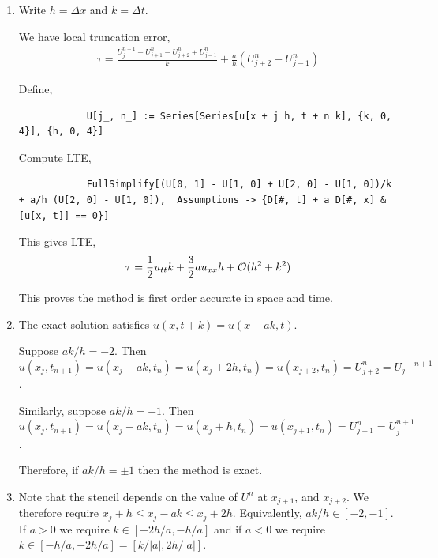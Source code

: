 \documentclass[10pt]{article}
\begin{document}
\begin{solution}[Solution]
\begin{enumerate}[label=(\alph*)]
    \item Write \( h = \Delta x \) and \( k = \Delta t \).

        We have local truncation error,
        \begin{align*}
            \tau = \frac{U_j^{n+1} - U_{j+1}^n- U_{j+2}^n + U_{j-1}^n}{k} + \frac{a}{h} \left( U_{j+2}^n - U_{j-1}^n \right)
        \end{align*}
        
        Define,
        \begin{lstlisting}
            U[j_, n_] := Series[Series[u[x + j h, t + n k], {k, 0, 4}], {h, 0, 4}]
        \end{lstlisting}

        Compute LTE,
        \begin{lstlisting}
            FullSimplify[(U[0, 1] - U[1, 0] + U[2, 0] - U[1, 0])/k + a/h (U[2, 0] - U[1, 0]),  Assumptions -> {D[#, t] + a D[#, x] &[u[x, t]] == 0}]
        \end{lstlisting}
        
        This gives LTE,
        \begin{align*}
            \tau = \frac{1}{2}u_{tt} k + \frac{3}{2} a u_{xx}h + \mathcal{O}(h^2+k^2)
        \end{align*}
        
        This proves the method is first order accurate in space and time.

    \item The exact solution satisfies \( u(x,t+k) = u(x-ak,t) \). 
        

        Suppose \( ak/h = -2 \). Then \( u(x_j,t_{n+1}) = u(x_j-ak,t_n) = u(x_j+2h,t_n) = u(x_{j+2},t_n) = U_{j+2}^n = U_j+^{n+1} \).
        
        Similarly, suppose \( ak/h = -1 \). Then \( u(x_j,t_{n+1}) = u(x_j-ak,t_n) = u(x_j+h,t_n) = u(x_{j+1},t_n) = U_{j+1}^n = U_j^{n+1} \).

        Therefore, if \( ak/h = \pm 1 \) then the method is exact.

    \item Note that the stencil depends on the value of \( U^n \) at \( x_{j+1} \), and \( x_{j+2} \). We therefore require \( x_j+h \leq x_{j}-ak \leq x_j + 2h \). Equivalently, \( ak/h \in [-2,-1] \). If \( a > 0 \) we require \( k\in[-2h/a,-h/a] \) and if \( a<0 \) we require \( k\in[-h/a,-2h/a] = [k/|a|,2h/|a|] \).


\end{enumerate}
\end{solution}
\end{document}
